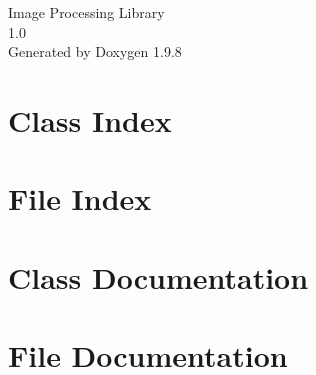 \documentclass[twoside]{book}
\newcommand{\+}{\discretionary{\mbox{\scriptsize$\hookleftarrow$}}{}{}}
\newcommand{\clearemptydoublepage}{%
    \newpage{\pagestyle{empty}\cleardoublepage}%
  }
\begin{document}
  \raggedbottom
    \hypersetup{pageanchor=false,
                bookmarksnumbered=true,
                pdfencoding=unicode
               }
  \begin{titlepage}
  \vspace*{7cm}
  \begin{center}%
  {\Large Image Processing Library}\\
  [1ex]\large 1.\+0 \\
  \vspace*{1cm}
  {\large Generated by Doxygen 1.9.8}\\
  \end{center}
  \end{titlepage}
  \clearemptydoublepage
  \tableofcontents
  \clearemptydoublepage
  \hypersetup{pageanchor=true}

\chapter{Class Index}

\chapter{File Index}

\chapter{Class Documentation}

\chapter{File Documentation}




  \backmatter
  \newpage
  \clearemptydoublepage
  \printindex
\end{document}
